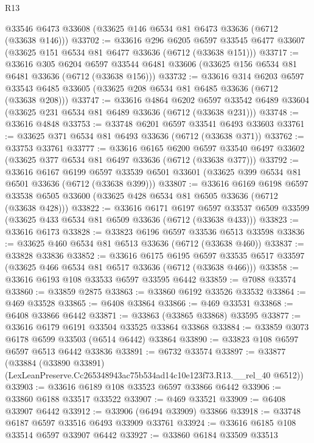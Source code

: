 \begin{lexlean}{R13}
\begin{coremodule}
    @33546
    @6473
    @33608
    (@33625 @146 @6534 @81 @6473 @33636 (@6712 (@33638 @146)))
@33702 := @33616
    @296
    @6205
    @6597
    @33545
    @6477
    @33607
    (@33625 @151 @6534 @81 @6477 @33636 (@6712 (@33638 @151)))
@33717 := @33616
    @305
    @6204
    @6597
    @33544
    @6481
    @33606
    (@33625 @156 @6534 @81 @6481 @33636 (@6712 (@33638 @156)))
@33732 := @33616
    @314
    @6203
    @6597
    @33543
    @6485
    @33605
    (@33625 @208 @6534 @81 @6485 @33636 (@6712 (@33638 @208)))
@33747 := @33616
    @4864
    @6202
    @6597
    @33542
    @6489
    @33604
    (@33625 @231 @6534 @81 @6489 @33636 (@6712 (@33638 @231)))
@33748 := @33616 @4848
@33753 := @33748 @6201 @6597 @33541 @6493 @33603
@33761 := @33625 @371 @6534 @81 @6493 @33636 (@6712 (@33638 @371))
@33762 := @33753 @33761
@33777 := @33616
    @6165
    @6200
    @6597
    @33540
    @6497
    @33602
    (@33625 @377 @6534 @81 @6497 @33636 (@6712 (@33638 @377)))
@33792 := @33616
    @6167
    @6199
    @6597
    @33539
    @6501
    @33601
    (@33625 @399 @6534 @81 @6501 @33636 (@6712 (@33638 @399)))
@33807 := @33616
    @6169
    @6198
    @6597
    @33538
    @6505
    @33600
    (@33625 @428 @6534 @81 @6505 @33636 (@6712 (@33638 @428)))
@33822 := @33616
    @6171
    @6197
    @6597
    @33537
    @6509
    @33599
    (@33625 @433 @6534 @81 @6509 @33636 (@6712 (@33638 @433)))
@33823 := @33616 @6173
@33828 := @33823 @6196 @6597 @33536 @6513 @33598
@33836 := @33625 @460 @6534 @81 @6513 @33636 (@6712 (@33638 @460))
@33837 := @33828 @33836
@33852 := @33616
    @6175
    @6195
    @6597
    @33535
    @6517
    @33597
    (@33625 @466 @6534 @81 @6517 @33636 (@6712 (@33638 @466)))
@33858 := @33616 @6193 @108 @33533 @6597 @33595 @6442
@33859 := @7088 @33574
@33860 := @33859 @2875
@33863 := @33860 @6192 @33526 @33532
@33864 := @469 @33528
@33865 := @6408 @33864
@33866 := @469 @33531
@33868 := @6408 @33866 @6442
@33871 := @33863 (@33865 @33868) @33595
@33877 := @33616 @6179 @6191 @33504 @33525 @33864 @33868
@33884 := @33859 @3073 @6178 @6599 @33503 (@6514 @6442) @33864
@33890 := @33823 @108 @6597 @6597 @6513 @6442 @33836
@33891 := @6732 @33574
@33897 := @33877
    (@33884 (@33890 @33891) (LexLeanPreserve.Cc265348943ac75b534ad14c10e123f73.R13.__rel_40 @6512))
@33903 := @33616 @6189 @108 @33523 @6597 @33866 @6442
@33906 := @33860 @6188 @33517 @33522
@33907 := @469 @33521
@33909 := @6408 @33907 @6442
@33912 := @33906 (@6494 @33909) @33866
@33918 := @33748 @6187 @6597 @33516 @6493 @33909 @33761
@33924 := @33616 @6185 @108 @33514 @6597 @33907 @6442
@33927 := @33860 @6184 @33509 @33513

\end{coremodule}
\end{lexlean}
